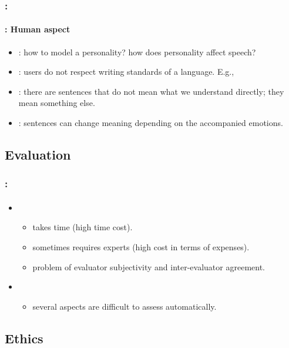 \documentclass[xcolor=table]{beamer}
\begin{document}
\begin{frame}
	\frametitle{\insertshortsubtitle: \insertsection}
	\framesubtitle{\insertsubsection: Human aspect}

	\begin{itemize}
		\item {}: how to model a personality? how does personality affect speech?
		\item {}: users do not respect writing standards of a language. E.g., 
		\item {}: there are sentences that do not mean what we understand directly; they mean something else.
		\item {}: sentences can change meaning depending on the accompanied emotions.
	\end{itemize}

\end{frame}


\subsection{Evaluation}

\begin{frame}
	\frametitle{\insertshortsubtitle: \insertsection}
	\framesubtitle{\insertsubsection}

	\begin{itemize}
		\item {}
		\begin{itemize}
			\item takes time (high time cost).
			\item sometimes requires experts (high cost in terms of expenses).
			\item problem of evaluator subjectivity and inter-evaluator agreement.
		\end{itemize}
		\item {}
		\begin{itemize}
			\item several aspects are difficult to assess automatically.
		\end{itemize}
	\end{itemize}

\end{frame}

\subsection{Ethics}
\end{document}

